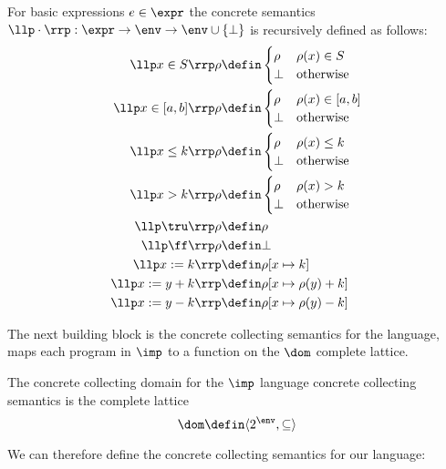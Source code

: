 \begin{definition}
  For basic expressions \(e \in \expr\) the concrete semantics \(\llp
  \cdot \rrp : \expr \to \env \to \env \cup \{\bot\}\) is recursively
  defined as follows:
  \begin{align*}
    \llp x\in S \rrp \rho & \defin \begin{cases} \rho & \rho(x)\in S \\ \bot & \text{otherwise} \end{cases} \\
    \llp x\in [a,b] \rrp \rho & \defin \begin{cases} \rho & \rho(x)\in [a,b] \\ \bot & \text{otherwise} \end{cases} \\
    \llp x \leq k \rrp \rho & \defin \begin{cases} \rho & \rho(x)\leq k \\ \bot & \text{otherwise} \end{cases} \\
    \llp x > k \rrp \rho & \defin \begin{cases} \rho & \rho(x) > k \\ \bot & \text{otherwise} \end{cases} \\
    \llp \tru \rrp \rho & \defin \rho \\
    \llp \ff \rrp \rho & \defin \bot \\
    \llp x := k \rrp & \defin \rho [x \mapsto k] \\
    \llp x := y + k \rrp & \defin \rho [x \mapsto \rho(y) + k] \\
    \llp x := y - k \rrp & \defin \rho [x \mapsto \rho(y) - k] \\
  \end{align*}
\end{definition}

The next building block is the concrete collecting semantics for the
language, maps each program in \(\imp\) to a function on the \(\dom\)
complete lattice.

\begin{definition}
  The concrete collecting domain for the \(\imp\) language concrete
  collecting semantics is the complete lattice \[\dom \defin \langle
  2^\env , \subseteq \rangle \]
\end{definition}

We can therefore define the concrete collecting semantics for our
language:

